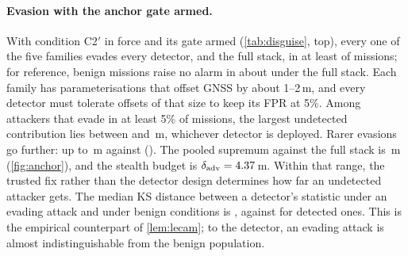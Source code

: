 \paragraph{Evasion with the anchor gate armed.}
With condition C2$'$ in force and its gate armed (\cref{tab:disguise}, top),
every one of the five families evades every detector, and the full stack, in
at least \nCrossEvMin{} of missions; for reference, benign missions raise no
alarm in about \nBenignNoAlarm{} under the full stack. Each family has
parameterisations that offset GNSS by about 1--2\,m, and every detector must
tolerate offsets of that size to keep its FPR at 5\%. Among attackers that evade
in at least 5\% of missions, the largest undetected contribution lies between
\nDevSingleMin{} and \nDevSingleMax\,m, whichever detector is deployed.
Rarer evasions go further: up to \nGatedUnfMax\,m against \nGatedUnfStacks{}
(\nGatedUnfFam). The pooled supremum against the full stack is \nAnchorMaxFive\,m
(\cref{fig:anchor}), and the stealth budget is $\delta_{\mathrm{adv}}=4.37$\,m. Within that
range, the trusted fix rather than the detector design determines how far an
undetected attacker gets. The median KS distance between a detector's statistic under an
evading attack and under benign conditions is \nKsStealthyMed{}, against
\nKsCaughtMed{} for detected ones. This is the empirical counterpart of
\cref{lem:lecam}; to the detector, an evading attack is almost
indistinguishable from the benign population.

